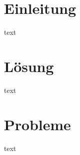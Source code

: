 \chapter{Einleitung}
\label{cha:einleitung}
text
\chapter{Lösung}
\label{cha:loesung}
text
\chapter{Probleme}
\label{cha:probleme}
text

